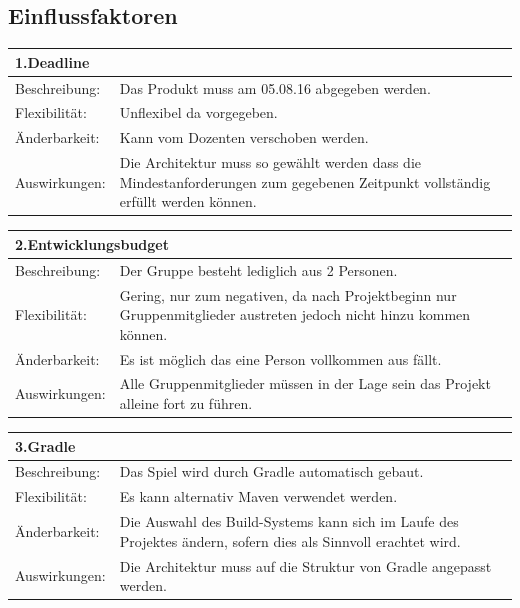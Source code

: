 \documentclass[fontsize=12pt,paper=a4,twoside]{scrartcl}
\begin{document}
\subsection{Einflussfaktoren}
\label{sec:einflussfaktoren}
\begin{tabular}{|p{3cm}|p{10cm}|}
	\hline
	\multicolumn{2}{|p{10cm}|}{\textbf{1.Deadline}}\\
	\hline
	Beschreibung:&Das Produkt muss am 05.08.16 abgegeben werden.\\
	\hline
	Flexibilität:&Unflexibel da vorgegeben.\\
	\hline
	Änderbarkeit:&Kann vom Dozenten verschoben werden.\\
	\hline
	Auswirkungen:& Die Architektur muss so gewählt werden dass die Mindestanforderungen zum gegebenen Zeitpunkt vollständig erfüllt werden können.\\
	\hline
\end{tabular}

\begin{tabular}{|p{3cm}|p{10cm}|}
	\hline
	\multicolumn{2}{|p{10cm}|}{\textbf{2.Entwicklungsbudget}}\\
	\hline
	Beschreibung:&Der Gruppe besteht lediglich aus 2 Personen.\\
	\hline
	Flexibilität:&Gering, nur zum negativen, da nach Projektbeginn nur Gruppenmitglieder austreten jedoch nicht hinzu kommen können.\\
	\hline
	Änderbarkeit:&Es ist möglich das eine Person vollkommen aus fällt.\\
	\hline
	Auswirkungen:&Alle Gruppenmitglieder müssen in der Lage sein das Projekt alleine fort zu führen.\\
	\hline
\end{tabular}

\begin{tabular}{|p{3cm}|p{10cm}|}
	\hline
	\multicolumn{2}{|p{10cm}|}{\textbf{3.Gradle}}\\
	\hline
	Beschreibung:&Das Spiel wird durch Gradle automatisch gebaut.\\
	\hline
	Flexibilität:&Es kann alternativ Maven verwendet werden.\\
	\hline
	Änderbarkeit:&Die Auswahl des Build-Systems kann sich im Laufe des Projektes ändern, sofern dies als Sinnvoll erachtet wird.\\
	\hline
	Auswirkungen:&Die Architektur muss auf die Struktur von Gradle angepasst werden.\\
	\hline
\end{tabular}
\end{document}
